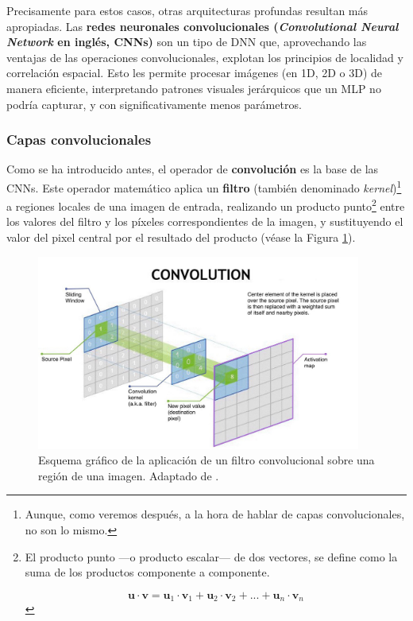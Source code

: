 Precisamente para estos casos, otras arquitecturas profundas resultan más apropiadas.
Las \textbf{redes neuronales convolucionales (\textit{Convolutional Neural Network} en inglés, CNNs)} son un 
tipo de DNN que, aprovechando las ventajas de las operaciones convolucionales, explotan los principios de 
localidad y correlación espacial. Esto les permite procesar imágenes (en 1D, 2D o 3D) de manera eficiente, 
interpretando patrones visuales jerárquicos que un MLP no podría capturar, y con significativamente menos 
parámetros.


\subsubsection{Capas convolucionales}

Como se ha introducido antes, el operador de \textbf{convolución} es la base de las CNNs. Este operador 
matemático aplica un \textbf{filtro} (también denominado \textit{kernel})\footnote{
    Aunque, como veremos después, a la hora de hablar de capas convolucionales, no son lo mismo.
} a regiones locales de una imagen de 
entrada, realizando un producto punto\footnote{El producto punto ---o producto escalar--- de dos vectores, se 
define como la suma de los productos componente a componente. 

$$
\mathbf{u} \cdot \mathbf{v} = \mathbf{u}_1 \cdot \mathbf{v}_1 + \mathbf{u}_2 \cdot \mathbf{v}_2 + ... + 
\mathbf{u}_n \cdot \mathbf{v}_n
$$
} 
entre los valores del filtro y los píxeles correspondientes de la imagen, y sustituyendo el valor del pixel 
central por el resultado del producto (véase la Figura \ref{fig:conv_op}).

\begin{figure}[h]
    \centering
    \includegraphics[width=0.95\textwidth]{capitulos/cap_02/imagenes/convolution_operation.jpg}
    \caption{
        Esquema gráfico de la aplicación de un filtro convolucional sobre una región de una imagen.
        Adaptado de \cite{nvidia2025convolutionoperation}.
    } 
    \label{fig:conv_op}
\end{figure}

